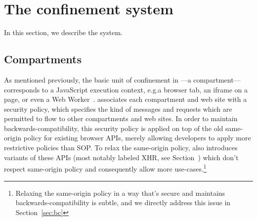 \section{The \sys{} confinement system}
\label{sec:system}

In this section, we describe the \sys{} system. 

\subsection{Compartments}




As mentioned previously, the basic unit of confinement in \sys{}---a
compartment---corresponds to a JavaScript execution context, e.g.\@ a
browser tab, an iframe on a page, or even a Web Worker~\cite{workers}.
%
\sys{} associates each compartment and web site with a security policy,
which specifies the kind of messages and requests which are permitted to
flow to other compartments and web sites.
%
In order to maintain backwards-compatibility, this security policy is
applied on top of the old same-origin policy for existing browser APIs,
merely allowing developers to apply more restrictive policies than
SOP\@.
%
To relax the same-origin policy, \sys{} also introduces variants of
these APIs (most notably labeled XHR, see Section~) which don't
respect same-origin policy and consequently allow more
use-cases.\footnote{Relaxing the same-origin policy in a way that's
secure and maintains backwards-compatibility is subtle, and we directly
address this issue in Section~\ref{sec:bc}}


